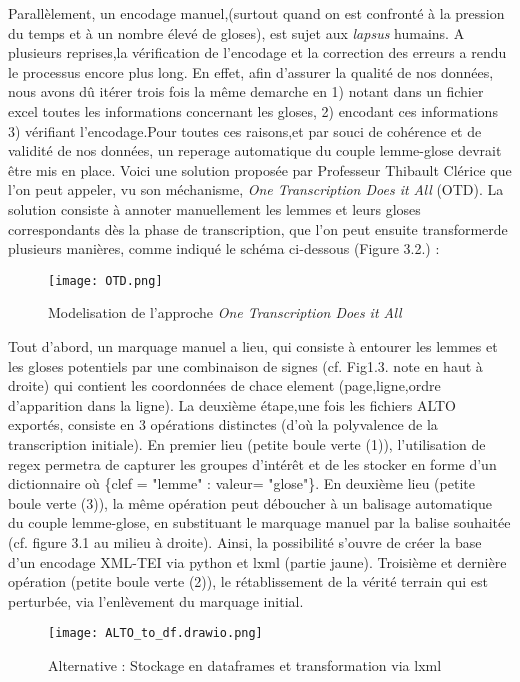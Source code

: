 \documentclass[a4paper, twoside, 12pt]{book}
\begin{document}
Parallèlement, un encodage manuel,(surtout quand on est confronté à la pression du temps et à un nombre élevé de gloses), est sujet aux \textit{lapsus} humains. A plusieurs reprises,la vérification de l'encodage et la correction des erreurs a rendu le processus encore plus long. En effet, afin d'assurer la qualité de nos données, nous avons dû itérer trois fois la même demarche en 1) notant dans un fichier excel toutes les informations concernant les gloses, 2) encodant ces informations 3) vérifiant l'encodage.Pour toutes ces raisons,et par souci de cohérence et de validité de nos données, un reperage automatique du couple lemme-glose devrait être mis en place.  Voici une solution proposée par Professeur Thibault Clérice que l'on peut appeler, vu son méchanisme, \textit{One Transcription Does it All} (OTD). La solution consiste à annoter manuellement les lemmes et leurs gloses correspondants dès la phase de transcription, que l'on peut ensuite transformerde plusieurs manières, comme indiqué le schéma ci-dessous (Figure 3.2.) : 

\begin{figure}[H]
    \centering
    \texttt{[image: OTD.png]}
    \caption{Modelisation de l'approche \textit{One Transcription Does it All}}
\end{figure}

Tout d'abord, un marquage manuel a lieu, qui consiste à entourer les lemmes et les gloses potentiels par une combinaison de signes (cf. Fig1.3. note en haut à droite) qui contient les coordonnées de chace element (page,ligne,ordre d'apparition dans la ligne). La deuxième étape,une fois les fichiers ALTO exportés, consiste en 3 opérations distinctes (d'où la polyvalence de la transcription initiale). En premier lieu (petite boule verte (1)), l'utilisation de regex permetra de capturer les groupes d'intérêt et de les stocker en forme d'un dictionnaire où \{clef = "lemme" : valeur= "glose"\}. En deuxième lieu (petite boule verte (3)), la même opération peut déboucher à un balisage automatique du couple lemme-glose, en substituant le marquage manuel par la balise souhaitée (cf. figure 3.1 au milieu à droite). Ainsi, la possibilité s'ouvre de créer la base d'un encodage XML-TEI via python et lxml (partie jaune). Troisième et dernière opération (petite boule verte (2)), le rétablissement de la vérité terrain qui est perturbée, via l'enlèvement du marquage initial. 

\begin{figure}[H]
    \centering
    \texttt{[image: ALTO\_to\_df.drawio.png]}
    \caption{Alternative : Stockage en dataframes et transformation via lxml }
\end{figure}
\end{document}
